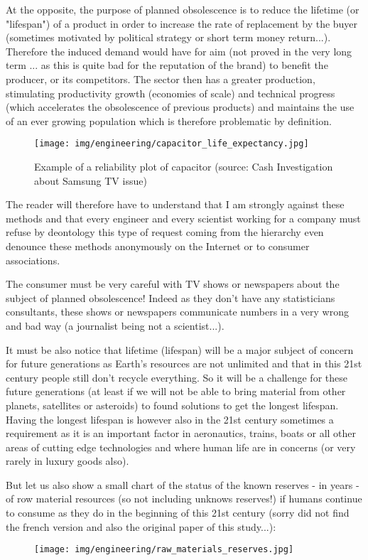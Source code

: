 	At the opposite, the purpose of planned obsolescence is to reduce the lifetime (or "lifespan") of a product in order to increase the rate of replacement by the buyer (sometimes motivated by political strategy or short term  money return...). Therefore the induced demand would have for aim (not proved in the very long term ... as this is quite bad for the reputation of the brand) to benefit the producer, or its competitors. The sector then has a greater production, stimulating productivity growth (economies of scale) and technical progress (which accelerates the obsolescence of previous products) and maintains the use of an ever growing population which is therefore problematic by definition.
	\begin{figure}[H]
		\centering
		\texttt{[image: img/engineering/capacitor\_life\_expectancy.jpg]}
		\caption[]{Example of a reliability plot of capacitor (source: Cash Investigation about Samsung TV issue) }
	\end{figure}
	The reader will therefore have to understand that I am strongly against these methods and that every engineer and every scientist working for a company must refuse by deontology this type of request coming from the hierarchy even denounce these methods anonymously on the Internet or to consumer associations.
	\begin{tcolorbox}[title=Remark,colframe=black,arc=10pt]
	The consumer must be very careful with TV shows or newspapers about the subject of planned obsolescence! Indeed as they don't have any statisticians consultants, these shows or newspapers communicate numbers in a very wrong and bad way (a journalist being not a scientist...).
	\end{tcolorbox}
		
	It must be also notice that lifetime (lifespan) will be a major subject of concern for future generations as Earth's resources are not unlimited and that in this 21st century people still don't recycle everything. So it will be a challenge for these future generations (at least if we will not be able to bring material from other planets, satellites or asteroids) to found solutions to get the longest lifespan. Having the longest lifespan is however also in the 21st century sometimes a requirement as it is an important factor in aeronautics, trains, boats or all other areas of cutting edge technologies and where human life are in concerns (or very rarely in luxury goods also).

	But let us also show a small chart of the status of the known reserves - in years - of row material resources (so not including unknows reserves!) if humans continue to consume as they do in the beginning of this 21st century (sorry did not find the french version and also the original paper of this study...):
	\begin{figure}[H]
		\centering
		\texttt{[image: img/engineering/raw\_materials\_reserves.jpg]}
	\end{figure}
		
